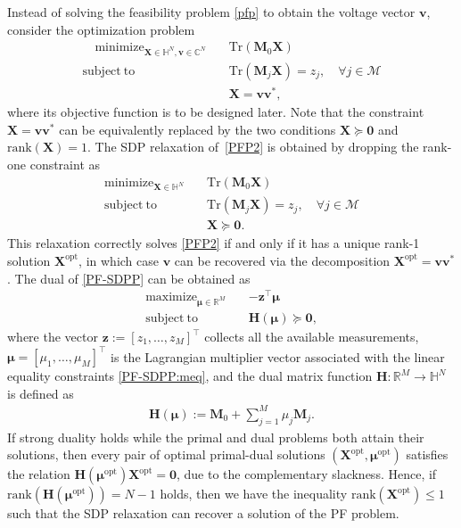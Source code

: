 \documentclass[journal,twoside]{IEEEtran}
\newcommand{\rank}{{\mathrm {rank}}}
\newcommand{\Tr}{\mathrm{Tr}}
\newcommand{\st}{\mathrm{subject~to}}
\newcommand{\bv}{\mathbf{v}}
\newcommand{\bz}{\mathbf{z}}
\newcommand{\bH}{\mathbf{H}}
\newcommand{\bM}{\mathbf{M}}
\newcommand{\bX}{\mathbf{X}}
\newcommand{\bmu}{\bm{\mu}}
\newcommand{\cM}{{\mathcal M}}
\DeclareMathOperator*{\mini}{\mathrm{minimize}}
\DeclareMathOperator*{\maxi}{\mathrm{maximize}}
\begin{document}
Instead of solving the feasibility problem \eqref{pfp} to obtain the voltage vector $\bv$,
consider the  optimization problem
\begin{subequations}\label{PFP2}
\begin{align}
\quad \mini_{\bX \in \mathbb{H}^N, \bv \in \mathbb{C}^N} \quad &\Tr(\bM_0\bX) \\
\st\quad  &\Tr(\bM_j\bX) = z_j,\quad\forall  j\in \cM \\%
\quad & \bX = \bv\bv^{*},
\end{align}
\end{subequations}
where its objective function is to be designed later.
Note that the constraint $\bX = \bv\bv^{*}$ can be equivalently replaced by the two conditions $\bX \succeq \mathbf{0}$ and $\rank(\bX) = 1$.
The SDP relaxation of~\eqref{PFP2} is obtained by dropping the rank-one constraint as
\begin{subequations}\label{PF-SDPP}
\begin{align}
\mini_{\bX \in \mathbb{H}^N}\quad &\Tr(\bM_0\bX) \label{PF-SDPP:obj} \\
\st\quad  &\Tr(\bM_j\bX) = z_j,\quad\forall  j\in \cM \label{PF-SDPP:meq} \\
\quad & \bX \succeq \mathbf{0}.\label{PF-SDPP:cone}
\end{align}
\end{subequations}
This relaxation correctly solves \eqref{PFP2} if and only if  it has a unique rank-1 solution $\bX^{\text{opt}}$, in which case $\bv$ can be recovered via the decomposition $\bX^{\text{opt}}=\bv \bv^{*}$.
The dual of \eqref{PF-SDPP} can be obtained as
\begin{subequations}\label{PF-SDPD}
\begin{align}
\maxi_{\bmu \in \mathbb{R}^M}\quad &-\bz^{\top}\bmu \\
\st\quad  &%
\mathbf{H}(\boldsymbol{\mu}) \succeq \mathbf{0}, \label{PF-SDPD:PSD}
\end{align}
\end{subequations}
where the vector $\bz:=[z_1,\ldots,z_M]^{\top}$ collects all the available measurements,
$\bmu = [\mu_1,\ldots,\mu_M]^{\top} $ is the Lagrangian multiplier vector associated with
the linear equality constraints \eqref{PF-SDPP:meq}, and  the dual matrix function $\mathbf{H}:\mathbb{R}^M\to\mathbb{H}^N$ is defined as
\begin{align}
\mathbf{H}(\boldsymbol{\mu}):=\bM_0 + \sum_{j = 1}^M \mu_j\bM_j.\label{Hdef}
\end{align}
If strong duality holds while the primal and dual problems both attain their solutions, then every pair of optimal primal-dual solutions $(\mathbf{X}^{\mathrm{opt}},\boldsymbol{\mu}^{\mathrm{opt}})$ satisfies the relation $\bH(\boldsymbol{\mu}^{\mathrm{opt}}) \bX^{\mathrm{opt}}= \mathbf{0}$, due to the complementary slackness.
Hence,  if $\rank(\bH(\boldsymbol{\mu}^{\mathrm{opt}})) = N-1$ holds,  then we have the inequality $\rank(\bX^{\mathrm{opt}}) \leq 1$ such that the SDP relaxation can recover a solution of the PF problem.
\end{document}
